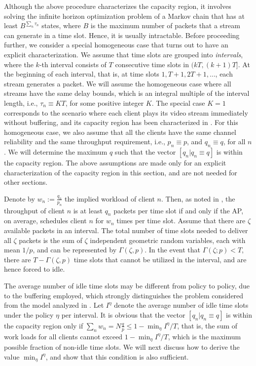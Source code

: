 \documentclass[10pt,nocopyrightspace]{sigplan-proc-varsize-1in}
\begin{document}
Although the above procedure characterizes the capacity region, it involves solving the infinite horizon optimization problem of a Markov chain that has at least $B^{\sum_n\tau_n}$ states, where $B$ is the maximum number of packets that a stream can generate in a time slot. Hence, it is usually intractable. Before proceeding further, we consider a special homogeneous case that turns out to have an explicit characterization. We assume that time slots are grouped into \emph{intervals}, where the $k$-th interval consists of $T$ consecutive time slots in $(kT, (k+1)T]$. At the beginning of each interval, that is, at time slots $1,T+1,2T+1,\dots$, each stream generates a packet. We will assume the homogeneous case where all streams have the same delay bounds, which is an integral multiple of the interval length, i.e., $\tau_n\equiv KT$, for some positive integer $K$. The special case $K=1$ corresponds to the scenario where each client plays its video stream immediately without buffering, and its capacity region has been characterized in \cite{IH09}. For this homogeneous case, we also assume that all the clients have the same channel reliability and the same throughput requirement, i.e., $p_{n}\equiv p$, and $q_{n}\equiv q$, for all $n$. We will determine the maximum $q$ such that the vector $[q_n|q_n\equiv q]$ is within the capacity region. The above assumptions are made only for an explicit characterization of the capacity region in this section, and are not needed for other sections.

Denote by $w_n :=\frac{q_n}{p_n}$ the implied workload of client $n$. Then, as noted in \cite{IH09}, the throughput of client $n$ is at least $q_{n}$ packets per time slot if and only if the AP, on average, schedules client $n$ for $w_{n}$ times per time slot. Assume that there are $\zeta$ available packets in an interval. The total number of time slots needed to deliver all $\zeta$ packets is the sum of $\zeta$ independent geometric random variables, each with mean $1/p$, and can be represented by $\Gamma(\zeta,p)$. In the event that $\Gamma(\zeta;p)<T$, there are $T-\Gamma(\zeta,p)$ time slots that cannot be utilized in the interval, and are hence forced to idle.

The average number of idle time slots may be different from policy to policy, due to the buffering employed, which strongly distinguishes the problem considered from the model analyzed in \cite{IH09}. Let $I^{\eta}$ denote the average number of idle time slots under the policy $\eta$ per interval. It is obvious that the vector $[q_n|q_n\equiv q]$ is within the capacity region only if $\sum_nw_n=N\frac{q}{p}\leq 1-\min_{\eta}I^{\eta}/T$, that is, the sum of work loads for all clients cannot exceed $1-\min_{\eta}I^{\eta}/T$, which is the maximum possible fraction of non-idle time slots. We will next discuss how to derive the value $\min_{\eta}I^{\eta}$, and show that this condition is also sufficient.
\end{document}
